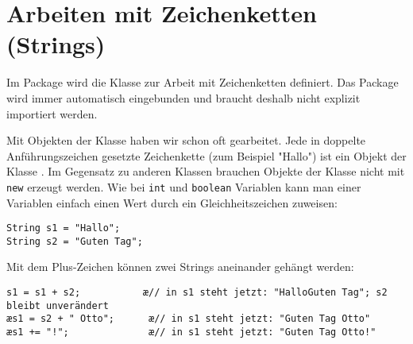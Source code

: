 \clearpage

\rehead[]{\textcolor{lightblue}{AvHG, Inf, My}}
\lohead[]{\textcolor{lightblue}{AvHG, Inf, My}}

\lstset{style=myJava}

\section{Arbeiten mit Zeichenketten (Strings)}


Im Package  wird die Klasse  zur Arbeit mit
Zeichenketten definiert. Das Package  wird immer
automatisch eingebunden und braucht deshalb nicht explizit importiert werden.

Mit Objekten der Klasse  haben wir schon oft gearbeitet. Jede in
doppelte Anführungszeichen gesetzte Zeichenkette (zum Beispiel "Hallo") ist ein
Objekt der Klasse . Im Gegensatz zu anderen Klassen brauchen
Objekte der Klasse  nicht mit \lstinline|new| erzeugt werden.
Wie bei \lstinline|int| und \lstinline|boolean| Variablen kann man einer
 Variablen einfach einen Wert durch ein Gleichheitszeichen
zuweisen:

\begin{lstlisting}
String s1 = "Hallo";
String s2 = "Guten Tag";
\end{lstlisting}

Mit dem Plus-Zeichen können zwei Strings aneinander gehängt werden:

\begin{lstlisting} 
s1 = s1 + s2;           æ// in s1 steht jetzt: "HalloGuten Tag"; s2 bleibt unverändert 
æs1 = s2 + " Otto";      æ// in s1 steht jetzt: "Guten Tag Otto"
æs1 += "!";              æ// in s1 steht jetzt: "Guten Tag Otto!"
\end{lstlisting}

